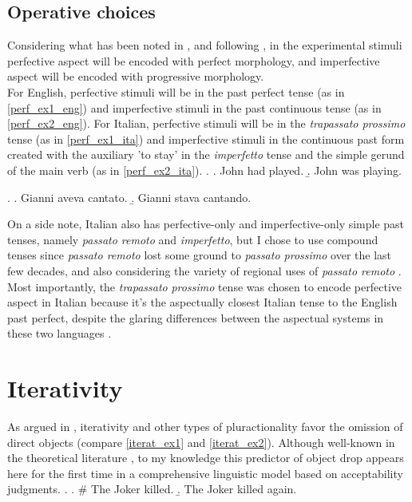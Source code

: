 \subsection{Operative choices}
Considering what has been noted in , and following \textcite{Medina2007}, in the experimental stimuli perfective aspect will be encoded with perfect morphology, and imperfective aspect will be encoded with progressive morphology.\\
For English, perfective stimuli will be in the past perfect tense (as in \ref{perf_ex1_eng}) and imperfective stimuli in the past continuous tense (as in \ref{perf_ex2_eng}). For Italian, perfective stimuli will be in the \textit{trapassato prossimo} tense (as in \ref{perf_ex1_ita}) and imperfective stimuli in the continuous past form created with the auxiliary 'to stay' in the \textit{imperfetto} tense and the simple gerund of the main verb (as in \ref{perf_ex2_ita}). 
\ex.\label{perf_ex_eng} \a. John had played. \label{perf_ex1_eng} 
\b. John was playing. \label{perf_ex2_eng}

\ex.\label{perf_ex_ita} \a. Gianni aveva cantato. \label{perf_ex1_ita} 
\b. Gianni stava cantando. \label{perf_ex2_ita}

On a side note, Italian also has perfective-only and imperfective-only simple past tenses, namely \textit{passato remoto} and \textit{imperfetto}, but I chose to use compound tenses since \textit{passato remoto} lost some ground to \textit{passato prossimo} over the last few decades, and also considering the variety of regional uses of \textit{passato remoto} \parencite{bertinetto1996distribuzione}. Most importantly, the \textit{trapassato} \textit{prossimo} tense was chosen to encode perfective aspect in Italian because it's the aspectually closest Italian tense to the English past perfect, despite the glaring differences between the aspectual systems in these two languages \parencite{bertinetto1992piucheperf}.


\section{Iterativity} 

As argued in , iterativity and other types of pluractionality favor the omission of direct objects (compare \ref{iterat_ex1} and \ref{iterat_ex2}). Although well-known in the theoretical literature \parencite{Glass2013, Glass2020, Ruda2017}, to my knowledge this predictor of object drop appears here for the first time in a comprehensive linguistic model based on acceptability judgments.
\ex.\label{iterat_ex} \a. \# The Joker killed. \label{iterat_ex1} 
\b. The Joker killed again. \label{iterat_ex2}

